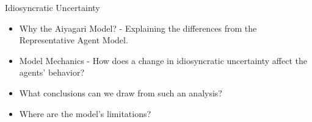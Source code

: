 \documentclass{beamer}
\begin{document}
\begin{frame}{Idiosyncratic Uncertainty}
	\begin{itemize}
	
	\item {
	Why the Aiyagari Model? - Explaining the 				differences from the Representative Agent Model.
	}
	\item {
	Model Mechanics - How does a change in 					idiosyncratic uncertainty affect the agents' behavior?
	}
	\item {
	What conclusions can we draw from such an analysis?
	}
	\item {
	Where are the model's limitations?
	}		
	\end{itemize}

\end{frame}
\end{document}

